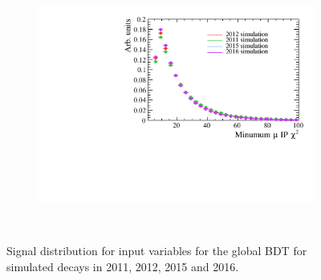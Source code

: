 \begin{figure}
 \begin{subfigure}[b]{0.48\textwidth}
        \includegraphics[width=\textwidth]{./Figs/Selection/signal_muIPS.pdf}
        \caption{ }
        \label{fig:BDTsig}
    \end{subfigure}
    ~ %
 



    \caption{Signal distribution for input variables for the global BDT for \bsmumu simulated decays in 2011, 2012, 2015 and 2016.}
    \label{fig:signalvars}
\end{figure}



